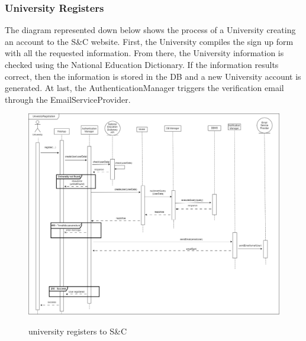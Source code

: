 \documentclass[a4paper,12pt]{article}
\begin{document}
\subsubsection*{University Registers}
The diagram represented down below shows the process of a University creating an account to the S\&C website. First, the University compiles the sign up form with all the requested information. From there, the University information is checked using the National Education Dictionary. If the information results correct, then the information is stored in the DB and a new University account is generated. At last, the AuthenticationManager
triggers the verification email through the EmailServiceProvider.
\begin{figure}[H]
\centering
\includegraphics[scale = 0.30]{DD_figures/RuntimeView/UniversityRegistrationRV.drawio.png}\\
\caption{university registers to S\&C}
\end{figure}
\end{document}
